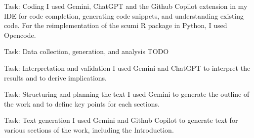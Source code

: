 \documentclass[11pt]{article}
\begin{document}
\vspace{.25em}

\begin{answerbox}{Task: Coding}
     I used Gemini, ChatGPT and the Github Copilot extension in my IDE for code completion, generating code snippets, and understanding existing code. For the reimplementation of the scumi R package in Python, I used Opencode.
\end{answerbox}

\vspace{.25em}

\begin{answerbox}{Task: Data collection, generation, and analysis}
     TODO
\end{answerbox}

\vspace{.25em}

\begin{answerbox}{Task: Interpretation and validation}
     I used Gemini and ChatGPT to interpret the results and to derive implications.
\end{answerbox}

\vspace{.25em}

\begin{answerbox}{Task: Structuring and planning the text}
     I used Gemini to generate the outline of the work and to define key points for each sections.
\end{answerbox}

\vspace{.25em}

\begin{answerbox}{Task: Text generation}
     I used Gemini and Github Copilot to generate text for various sections of the work, including the Introduction. %
\end{answerbox}
\end{document}

